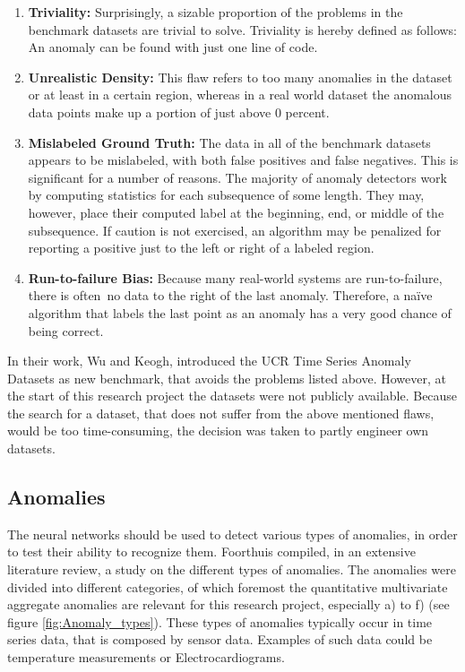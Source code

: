 \begin{enumerate}
	\item \textbf{Triviality:} Surprisingly, a sizable proportion of the problems in the benchmark datasets are trivial to solve. Triviality is hereby defined as follows: An anomaly can be found with just one line of code.
	\item \textbf{Unrealistic Density:} This flaw refers to too many anomalies in the dataset or at least in a certain region, whereas in a real world dataset the anomalous data points make up a portion of just above 0 percent.   
	\item \textbf{Mislabeled Ground Truth:} The data in all of the benchmark datasets appears to be mislabeled, with both false positives and false negatives. This is significant for a number of reasons. The majority of anomaly detectors work by computing statistics for each subsequence of some length. They may, however, place their computed label at the beginning, end, or middle of the subsequence. If caution is not exercised, an algorithm may be penalized for reporting a positive just to the left or right of a labeled region.
	\item \textbf{Run-to-failure Bias:} Because many real-world systems are run-to-failure, there is often no data to the right of the last anomaly. Therefore, a naïve algorithm that labels the last point as an anomaly has a very good chance of being correct.
\end{enumerate}

In their work, Wu and Keogh, introduced the UCR Time Series Anomaly Datasets as new benchmark, that avoids the problems listed above. However, at the start of this research project the datasets were not publicly available. Because the search for a dataset, that does not suffer from the above mentioned flaws, would be too time-consuming, the decision was taken to partly engineer own datasets.
\newline
\subsection{Anomalies}
The neural networks should be used to detect various types of anomalies, in order to test their ability to recognize them. Foorthuis \parencite{YEAR} compiled, in an extensive literature review, a study on the different types of anomalies. The anomalies were divided into different categories, of which foremost the quantitative multivariate aggregate anomalies are relevant for this research project, especially a) to f) (see figure \ref{fig:Anomaly_types}). These types of anomalies typically occur in time series data, that is composed by sensor data. Examples of such data could be temperature measurements or Electrocardiograms.

